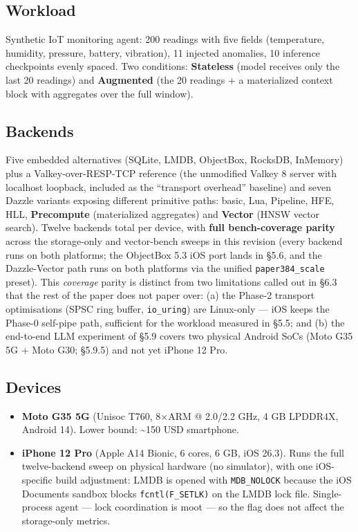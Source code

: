 \subsection{Workload}\label{workload}

Synthetic IoT monitoring agent: 200 readings with five fields (temperature,
humidity, pressure, battery, vibration), 11 injected anomalies, 10 inference
checkpoints evenly spaced. Two conditions: \textbf{Stateless} (model receives
only the last 20 readings) and \textbf{Augmented} (the 20 readings + a
materialized context block with aggregates over the full window).

\subsection{Backends}\label{backends}

Five embedded alternatives (SQLite, LMDB, ObjectBox, RocksDB, InMemory) plus a
Valkey-over-RESP-TCP reference (the unmodified Valkey 8 server with localhost
loopback, included as the ``transport overhead'' baseline) and seven Dazzle
variants exposing different primitive paths: basic, Lua, Pipeline, HFE, HLL,
\textbf{Precompute} (materialized aggregates) and \textbf{Vector} (HNSW vector
search). Twelve backends total per device, with \textbf{full bench-coverage
parity} across the storage-only and vector-bench sweeps in this revision (every
backend runs on both platforms; the ObjectBox 5.3 iOS port lands in §5.6, and
the Dazzle-Vector path runs on both platforms via the unified
\texttt{paper384\_scale} preset). This \emph{coverage} parity is distinct from
two limitations called out in §6.3 that the rest of the paper does not paper
over: (a) the Phase-2 transport optimisations (SPSC ring buffer,
\texttt{io\_uring}) are Linux-only --- iOS keeps the Phase-0 self-pipe path,
sufficient for the workload measured in §5.5; and (b) the end-to-end LLM
experiment of §5.9 covers two physical Android SoCs (Moto G35 5G + Moto G30;
§5.9.5) and not yet iPhone 12 Pro.

\subsection{Devices}\label{devices}

\begin{itemize}
\tightlist
\item
  \textbf{Moto G35 5G} (Unisoc T760, 8×ARM @ 2.0/2.2 GHz, 4 GB LPDDR4X, Android
  14). Lower bound: \textasciitilde150 USD smartphone.
\item
  \textbf{iPhone 12 Pro} (Apple A14 Bionic, 6 cores, 6 GB, iOS 26.3). Runs the
  full twelve-backend sweep on physical hardware (no simulator), with one
  iOS-specific build adjustment: LMDB is opened with \texttt{MDB\_NOLOCK}
  because the iOS Documents sandbox blocks \texttt{fcntl(F\_SETLK)} on the LMDB
  lock file. Single-process agent --- lock coordination is moot --- so the flag
  does not affect the storage-only metrics.
\end{itemize}

